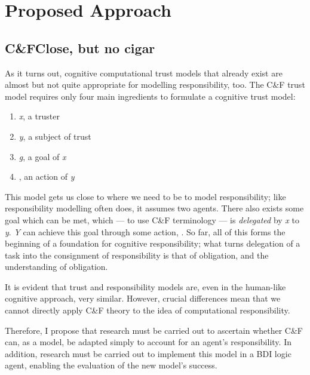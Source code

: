 \section{Proposed Approach}\label{sec:proposed_approach}

\subsection{C\&F\@ Close, but no cigar}
As it turns out, cognitive computational trust models that already exist are almost but not quite appropriate for modelling responsibility, too. The C\&F trust model requires only four main ingredients to formulate a cognitive trust model:

\begin{enumerate}
    \item \emph{x}, a truster
    \item \emph{y}, a subject of trust
    \item \emph{g}, a goal of \emph{x}
    \item \emph{\safealpha}, an action of \emph{y}
\end{enumerate}\par

This model gets us close to where we need to be to model responsibility; like responsibility modelling often does, it assumes two agents. There also exists some goal which can be met, which --- to use C\&F terminology --- is \emph{delegated} by \emph{x} to \emph{y}. \emph{Y} can achieve this goal through some action, \emph{\safealpha}. So far, all of this forms the beginning of a foundation for cognitive responsibility; what turns delegation of a task into the consignment of responsibility is that of obligation, and the understanding of obligation. \par

It is evident that trust and responsibility models are, even in the human-like cognitive approach, very similar. However, crucial differences mean that we cannot directly apply C\&F theory to the idea of computational responsibility. \par

Therefore, I propose that research must be carried out to ascertain whether C\&F can, as a model, be adapted simply to account for an agent's responsibility. In addition, research must be carried out to implement this model in a BDI logic agent, enabling the evaluation of the new model's success. 


